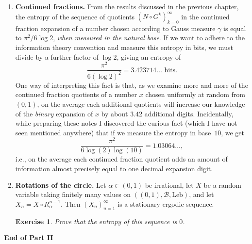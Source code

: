 \documentclass[12pt]{article}
\newtheorem{exercise}[thm]{Exercise}
\theoremstyle{example}
\begin{document}
\begin{enumerate}[1.]
\item \textbf{Continued fractions.} From the results discussed in the previous chapter, the entropy of the sequence of quotients $(N\circ G^k)_{k=0}^\infty$ in the continued fraction expansion of a number chosen according to Gauss measure $\gamma$ is equal to $\pi^2/6\log 2$, \emph{when measured in the natural base}. If we want to adhere to the information theory convention and measure this entropy in bits, we must divide by a further factor of $\log 2$, giving an entropy of
$$ \frac{\pi^2}{6(\log 2)^2} = 3.423714\ldots \textrm{ bits}. $$
One way of interpreting this fact is that, as we examine more and more of the continued fraction quotients of a number $x$ chosen uniformly at random from $(0,1)$, on the average each additional quotients will increase our knowledge of the \emph{binary} expansion of $x$ by about $3.42$ additional digits. Incidentally, while preparing these notes I discovered the curious fact (which I have not seen mentioned anywhere) that if we measure the entropy in base~$10$, we get
$$ \frac{\pi^2}{6\log(2)\log(10)} = 1.03064\ldots, $$
i.e., on the average each continued fraction quotient adds an amount of information almost precisely equal to one decimal expansion digit.
\item \textbf{Rotations of the circle.} Let $\alpha\in(0,1)$ be irrational, let $X$ be a random variable taking finitely many values on $((0,1), \mathcal{B}, \textrm{Leb})$, and let $X_n = X\circ R_\alpha^{n-1}$. Then $(X_n)_{n=1}^\infty$ is a stationary ergodic sequence.
\begin{exercise}
Prove that the entropy of this sequence is $0$.
\end{exercise}
\end{enumerate}




\bigskip \bigskip 
\begin{center}
\textbf{End of Part II}
\end{center}

\end{document}
